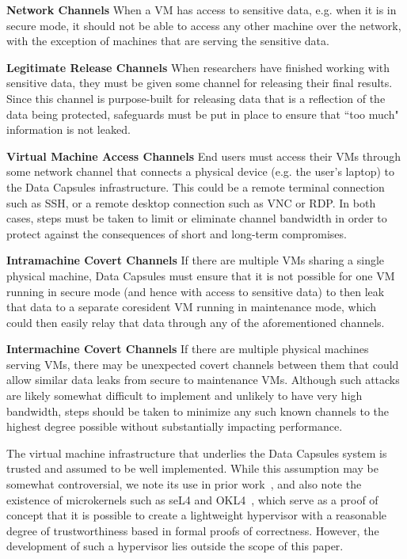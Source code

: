 \documentclass{acm_proc_article-sp}
\begin{document}
\textbf{Network Channels} When a VM has access to sensitive data, e.g. when it
is in secure mode, it should not be able to access any other machine over the
network, with the exception of machines that are serving the sensitive data.

\textbf{Legitimate Release Channels} When researchers have finished working with
sensitive data, they must be given some channel for releasing their final
results.  Since this channel is purpose-built for releasing data that is a
reflection of the data being protected, safeguards must be put in place to
ensure that ``too much" information is not leaked.

\textbf{Virtual Machine Access Channels} End users must access their VMs
through some network channel that connects a physical device (e.g. the user's
laptop) to the Data Capsules infrastructure.  This could be a remote terminal
connection such as SSH, or a remote desktop connection such as VNC or RDP.  In
both cases, steps must be taken to limit or eliminate channel bandwidth in order
to protect against the consequences of short and long-term compromises.

\textbf{Intramachine Covert Channels} If there are multiple VMs sharing a
single physical machine, Data Capsules must ensure that it is not possible for
one VM running in secure mode (and hence with access to sensitive data) to then
leak that data to a separate coresident VM running in maintenance mode, which
could then easily relay that data through any of the aforementioned channels.

\textbf{Intermachine Covert Channels} If there are multiple physical machines
serving VMs, there may be unexpected covert channels between them that could
allow similar data leaks from secure to maintenance VMs.  Although such attacks
are likely somewhat difficult to implement and unlikely to have very high
bandwidth, steps should be taken to minimize any such known channels to the
highest degree possible without substantially impacting performance.

The virtual machine infrastructure that underlies the Data Capsules system is
trusted and assumed to be well implemented.  While this assumption may be
somewhat controversial, we note its use in prior work~\cite{capsules}, and also
note the existence of microkernels such as seL4 and OKL4~\cite{sel4, OKL4},
which serve as a proof of concept that it is possible to create a lightweight
hypervisor with a reasonable degree of trustworthiness based in formal proofs
of correctness.  However, the development of such a hypervisor lies outside the
scope of this paper.
\end{document}
